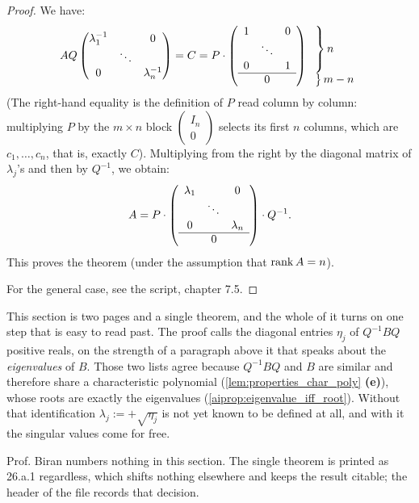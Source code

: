 \begin{proof}
We have:
\[
A Q \begin{pmatrix} \lambda_1^{-1} & & 0 \\ & \ddots & \\ 0 & & \lambda_n^{-1} \end{pmatrix} = C = P \cdot 
\left(
\begin{array}{ccc}
1 & & 0 \\
& \ddots & \\
0 & & 1 \\
\hline
\multicolumn{3}{c}{0}
\end{array}
\right)
\begin{array}{l}
\left. \vphantom{\begin{matrix} 1 \\ \ddots \\ 1 \end{matrix}} \right\} n \\
\left. \vphantom{\begin{matrix} 0 \end{matrix}} \right\} m-n
\end{array}
\]
(The right-hand equality is the definition of $P$ read column by column: multiplying $P$ by the $m \times n$ block $\left(\begin{smallmatrix} I_n \\ 0 \end{smallmatrix}\right)$ selects its first $n$ columns, which are $c_1, \dots, c_n$, that is, exactly $C$).
Multiplying from the right by the diagonal matrix of $\lambda_j$'s and then by $Q^{-1}$, we obtain:
\[
A = P \cdot \left(
\begin{array}{ccc}
\lambda_1 & & 0 \\
& \ddots & \\
0 & & \lambda_n \\
\hline
\multicolumn{3}{c}{0}
\end{array}
\right) \cdot Q^{-1}.
\]
This proves the theorem (under the assumption that $\operatorname{rank} A = n$).

For the general case, see the script, chapter 7.5.
\end{proof}


\begin{ainote}
This section is two pages and a single theorem, and the whole of it turns on one
step that is easy to read past. The proof calls the diagonal entries $\eta_j$ of
$Q^{-1} B Q$ positive reals, on the strength of a paragraph above it that speaks
about the \emph{eigenvalues} of $B$. Those two lists agree because $Q^{-1} B Q$
and $B$ are similar and therefore share a characteristic polynomial
(\cref{lem:properties_char_poly} \textbf{(e)}), whose roots are exactly the
eigenvalues (\cref{aiprop:eigenvalue_iff_root}). Without that identification
$\lambda_j := +\sqrt{\eta_j}$ is not yet known to be defined at all, and with it
the singular values come for free.

Prof. Biran numbers nothing in this section. The single theorem is printed as
26.a.1 regardless, which shifts nothing elsewhere and keeps the result citable;
the header of the file records that decision.
\end{ainote}
